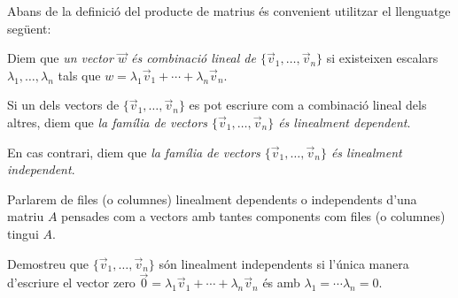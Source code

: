 Abans de la definició del producte de matrius és convenient utilitzar el llenguatge següent:
\begin{definicio}\label{def:dependlineal}
	Diem que \emph{un vector $\vec{w}$ és combinació lineal de $\{\vec{v}_1,\dots,\vec{v}_n\}$} si existeixen escalars $\lambda_1, \dots , \lambda_n$ tals que $w=\lambda_1\vec{v}_1+\cdots+\lambda_n\vec{v}_n$.
	
	Si un dels vectors de $\{\vec{v}_1,\dots,\vec{v}_n\}$ es pot escriure com a combinació lineal dels altres, diem que \emph{la família de vectors $\{\vec{v}_1,\dots,\vec{v}_n\}$ és linealment dependent}.
	
	En cas contrari, diem que \emph{la família de vectors $\{\vec{v}_1,\dots,\vec{v}_n\}$ és linealment independent}.
\end{definicio}

Parlarem de files (o columnes) linealment dependents o independents d'una matriu $A$ pensades com a vectors amb tantes components com files (o columnes) tingui $A$.

\begin{exercici}
	Demostreu que $\{\vec{v}_1,\dots,\vec{v}_n\}$ són linealment independents si l'única manera d'escriure el vector zero $\vec{0}=\lambda_1\vec{v}_1+\cdots+\lambda_n\vec{v}_n$ és amb $\lambda_1=\cdots\lambda_n=0$.
\end{exercici}

